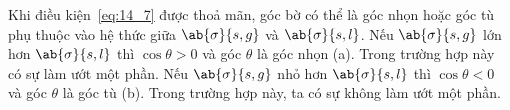 
Khi điều kiện~\eqref{eq:14_7} được thoả mãn, góc bờ có thể là góc nhọn hoặc góc tù phụ thuộc vào hệ thức giữa $\ab{\sigma}{s,g}$ và $\ab{\sigma}{s,l}$. Nếu $\ab{\sigma}{s,g}$ lớn hơn $\ab{\sigma}{s,l}$ thì $\cos\theta>0$ và góc $\theta$ là góc nhọn (a). Trong trường hợp này có sự làm ướt một phần. Nếu $\ab{\sigma}{s,g}$ nhỏ hơn $\ab{\sigma}{s,l}$ thì $\cos\theta<0$ và góc $\theta$ là góc tù (b). Trong trường hợp này, ta có sự không làm ướt một phần.


